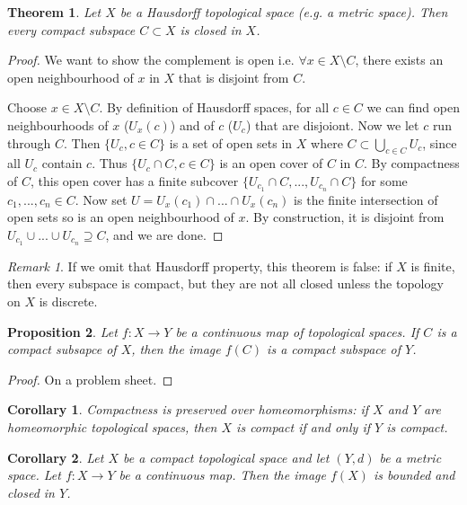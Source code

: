 \documentclass{article}
\theoremstyle{definition}
\theoremstyle{plain}%
\newtheorem{thm}{Theorem}[section]
\newtheorem{prop}[thm]{Proposition}
\newtheorem*{cor}{Corollary}
\theoremstyle{remark}
\newtheorem*{rem}{Remark}
\newcommand{\union}{\cup}
\newcommand{\Union}{\bigcup}
\newcommand{\intersection}{\cap}
\begin{document}
\begin{thm}
    Let $X$ be a Hausdorff topological space (e.g. a metric space). Then every compact subspace $C \subset X$ is closed in $X$.
\end{thm}

\begin{proof}
    We want to show the complement is open i.e. $\forall x \in X \setminus C$, there exists an open neighbourhood of $x$ in $X$ that is disjoint from $C$.
    
    Choose $x \in X \setminus C$. By definition of Hausdorff spaces, for all $c \in C$ we can find open neighbourhoods of $x$ ($U_x(c)$) and of $c$ ($U_c$) that are disjoiont. Now we let $c$ run through $C$. Then $\{U_c, c \in C\}$ is a set of open sets in $X$ where $C \subset \Union_{c \in C} U_c$, since all $U_c$ contain $c$. Thus $\{U_c \intersection C, c \in C\}$ is an open cover of $C$ in $C$. By compactness of $C$, this open cover has a finite subcover $\{U_{c_1} \intersection C, ..., U_{c_n} \intersection C\}$ for some $c_1, ..., c_n \in C$. Now set $U = U_{x}(c_1) \intersection ...  \intersection U_{x}(c_n)$ is the finite intersection of open sets so is an open neighbourhood of $x$. By construction, it is disjoint from $U_{c_1} \union ... \union U_{c_n} \supseteq C$, and we are done.
\end{proof}

\begin{rem}
    If we omit that Hausdorff property, this theorem is false: if $X$ is finite, then every subspace is compact, but they are not all closed unless the topology on $X$ is discrete. 
\end{rem}

\begin{prop}
    Let $f : X \to Y$ be a continuous map of topological spaces. If $C$ is a compact subsapce of $X$, then the image $f(C)$ is a compact subspace of $Y$.
\end{prop}

\begin{proof}
    On a problem sheet.
\end{proof}

\begin{cor}
    Compactness is preserved over homeomorphisms: if $X$ and $Y$ are homeomorphic topological spaces, then $X$ is compact if and only if $Y$ is compact.
\end{cor}

\begin{cor}\label{cor metric maps}
    Let $X$ be a compact topological space and let $(Y,d)$ be a metric space. Let $f : X \to Y$ be a continuous map. Then the image $f(X)$ is bounded and closed in $Y$. 
\end{cor}
\end{document}

